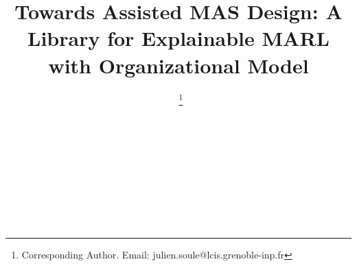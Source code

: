 \documentclass[doubleblind]{ecai}
\begin{document}

\begin{frontmatter}



    \title{Towards Assisted MAS Design: A Library for Explainable MARL with Organizational Model}



    \author[A,B]{~\thanks{Corresponding Author. Email: julien.soule@lcis.grenoble-inp.fr}}
    \author[A]{~}
    \author[A]{~}
    \author[B]{~}
    \author[C]{~}

    \address[A]{Univ. Grenoble Alpes, Grenoble INP, LCIS, 26000, Valence, France}
    \address[B]{Thales Land and Air Systems, BL IAS, Rennes, France}
    \address[C]{AICA IWG, La Guillermie, France}



\end{frontmatter}
\end{document}
